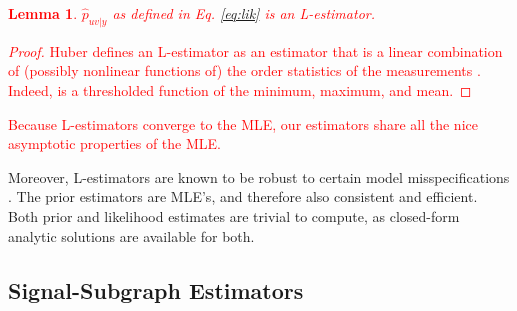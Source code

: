 \documentclass[10pt,journal,cspaper,compsoc]{IEEEtran}
\providecommand{\tr}[1]{\textcolor{red}{#1}}
\providecommand{\wh}[1]{\widehat{#1}}
\newcommand{\conv}{\rightarrow}
\newtheorem{Lem}{Lemma}[section]
\begin{document}
\tr{
\begin{Lem}
	$\wh{p}_{uv|y}$ as defined in Eq. \eqref{eq:lik}  is an L-estimator.
\end{Lem}
% 
\begin{proof}
Huber defines an L-estimator as an estimator that is a linear combination of (possibly nonlinear functions of) the order statistics of the measurements \cite{Huber1981}.  Indeed, is a thresholded function of the minimum, maximum, and mean.
\end{proof}
% 
Because L-estimators converge to the MLE, our estimators share all the nice asymptotic properties of the MLE.  }
% 
% 
Moreover, L-estimators are known to be robust to certain model misspecifications \cite{Huber1981}. The prior estimators are MLE's, and therefore also consistent and efficient.
% 
% 
% 
Both prior and likelihood estimates are trivial to compute, as closed-form analytic solutions are available for both.  %

\subsection{Signal-Subgraph Estimators} %
\label{ssub:subsubsection_name5}
\end{document}
